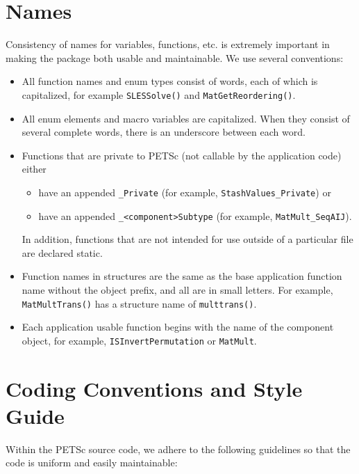\section{Names}
Consistency of names for variables, functions, etc. is extremely 
important in making the package both usable and maintainable.
We use several conventions:
\begin{itemize}
\item All function names and enum types consist of words, each of 
      which is capitalized, for example {\tt SLESSolve()} and 
      {\tt MatGetReordering()}.
\item All enum elements and macro variables are capitalized. When
      they consist of several
      complete words, there is an underscore between each word.
\item Functions that are private to PETSc (not callable by the 
      application code) either
      \begin{itemize}
        \item have an appended {\tt \_Private} (for example, 
           {\tt StashValues\_Private}) or
        \item have an appended {\tt \_<component>Subtype} (for example,
           {\tt MatMult\_SeqAIJ}).
      \end{itemize}

      In addition, functions that are not intended for use outside
      of a particular file are declared static.
\item Function names in structures are the same as the base application
      function name without the object prefix, and all are in small letters. 
      For example, {\tt MatMultTrans()} has a structure name of 
      {\tt multtrans()}.
\item Each application usable function begins with the name of the component object, 
      for example, {\tt ISInvertPermutation} or {\tt MatMult}. 
\end{itemize}

\section{Coding Conventions and Style Guide}

Within the PETSc source code, we adhere to the following guidelines
so that the code is uniform and easily maintainable:

